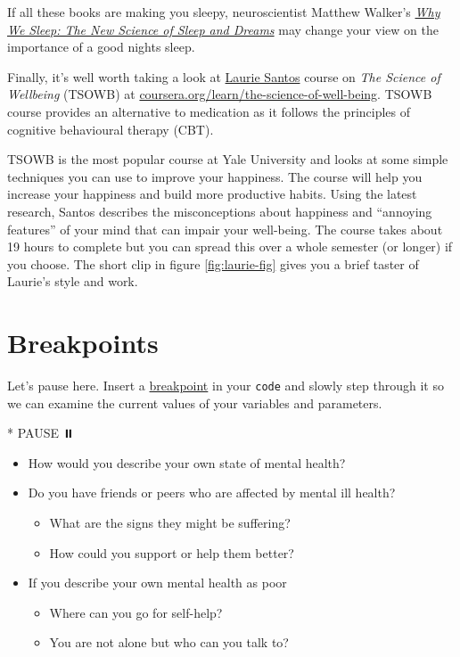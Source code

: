 \documentclass[
]{book}
\newenvironment{Shaded}{\begin{snugshade}}{\end{snugshade}}
\newcommand{\NormalTok}[1]{#1}
\newcommand{\SpecialStringTok}[1]{\textcolor[rgb]{0.31,0.60,0.02}{#1}}
\providecommand{\tightlist}{%
  \setlength{\itemsep}{0pt}\setlength{\parskip}{0pt}}
\begin{document}
If all these books are making you sleepy, neuroscientist Matthew Walker's \emph{\href{https://en.wikipedia.org/wiki/Why_We_Sleep}{Why We Sleep: The New Science of Sleep and Dreams}} may change your view on the importance of a good nights sleep. \citep{whywesleep}

Finally, it's well worth taking a look at \href{https://en.wikipedia.org/wiki/Laurie_R._Santos}{Laurie Santos} course on \emph{The Science of Wellbeing} (TSOWB) at \href{https://www.coursera.org/learn/the-science-of-well-being}{coursera.org/learn/the-science-of-well-being}. \citep{lauriesantos} TSOWB course provides an alternative to medication as it follows the principles of cognitive behavioural therapy (CBT).

TSOWB is the most popular course at Yale University and looks at some simple techniques you can use to improve your happiness. \citep{happinessny} The course will help you increase your happiness and build more productive habits. Using the latest research, Santos describes the misconceptions about happiness and ``annoying features'' of your mind that can impair your well-being. The course takes about 19 hours to complete but you can spread this over a whole semester (or longer) if you choose. The short clip in figure \ref{fig:laurie-fig} gives you a brief taster of Laurie's style and work.

\hypertarget{bp3}{%
\section{Breakpoints}\label{bp3}}

Let's pause here. Insert a \href{https://en.wikipedia.org/wiki/Breakpoint}{breakpoint} in your \texttt{code} and slowly step through it so we can examine the current values of your variables and parameters.

\begin{Shaded}
\begin{Highlighting}[]
\SpecialStringTok{* }\NormalTok{PAUSE ⏸️}
\end{Highlighting}
\end{Shaded}

\begin{itemize}
\tightlist
\item
  How would you describe your own state of mental health?
\item
  Do you have friends or peers who are affected by mental ill health?

  \begin{itemize}
  \tightlist
  \item
    What are the signs they might be suffering?
  \item
    How could you support or help them better?
  \end{itemize}
\item
  If you describe your own mental health as poor

  \begin{itemize}
  \tightlist
  \item
    Where can you go for self-help?
  \item
    You are not alone but who can you talk to?
  \end{itemize}
\end{itemize}
\end{document}
